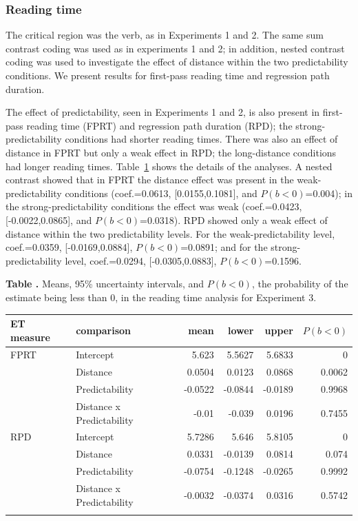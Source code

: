 \documentclass{frontiersSCNS}\usepackage{knitr} %
\begin{document}
\subsubsection{Reading time}

The critical region was the verb, as in Experiments 1 and 2.
The same sum contrast coding was used as in experiments 1 and 2; in addition, nested contrast coding was used to investigate the effect of distance within the two predictability conditions. 
We present results for first-pass reading time and regression path duration.

The effect of predictability, seen in Experiments 1 and 2, is also present in first-pass reading time (FPRT) and regression path duration (RPD); the strong-predictability conditions had shorter reading times.
There was also 
an effect of distance in FPRT but only a weak effect in RPD; the long-distance conditions had longer reading times. Table~\ref{Tab:03} shows the details of the analyses.
A nested contrast showed that in FPRT the distance 
effect was present in the weak-predictability conditions
(coef.=0.0613,
[0.0155,0.1081], and $P(b<0)$=0.004);
in the strong-predictability conditions the effect was weak
(coef.=0.0423,
[-0.0022,0.0865], and $P(b<0)$=0.0318).
RPD showed only a weak effect of distance within the two predictability levels. For the weak-predictability level,
coef.=0.0359,
[-0.0169,0.0884], $P(b<0)$=0.0891; and for the strong-predictability level,
coef.=0.0294,
[-0.0305,0.0883], $P(b<0)$=0.1596.

\begin{table}[!htbp]
\textbf{\label{Tab:03} Table . }{Means, 95\% uncertainty intervals, and $P(b<0)$, the probability of the estimate being less than 0, in the reading time analysis for Experiment 3.}
\processtable{}
{\begin{tabular}{llrrrr}\toprule
ET measure & comparison & mean & lower & upper & $P(b<0)$ \\
\midrule   
FPRT & Intercept  & 5.623 & 5.5627 & 5.6833 & 0\\
 & Distance  & 0.0504 & 0.0123 & 0.0868 & 0.0062\\
 & Predictability  & -0.0522 & -0.0844 & -0.0189 & 0.9968\\
 & Distance x Predictability  & -0.01 & -0.039 & 0.0196 & 0.7455\\
RPD & Intercept  & 5.7286 & 5.646 & 5.8105 & 0\\
 & Distance  & 0.0331 & -0.0139 & 0.0814 & 0.074\\
 & Predictability  & -0.0754 & -0.1248 & -0.0265 & 0.9992\\
 & Distance x Predictability  & -0.0032 & -0.0374 & 0.0316 & 0.5742\\
\botrule
\end{tabular}}{}
\end{table}
\end{document}

